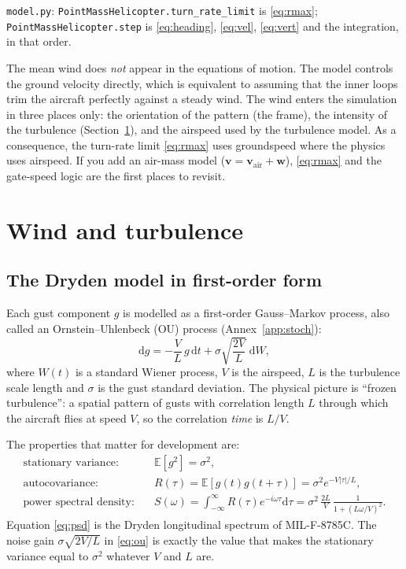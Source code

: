 \documentclass[11pt,a4paper]{article}
\newcommand{\code}[1]{\texttt{#1}}
\newcommand{\dd}{\mathrm{d}}
\newcommand{\E}{\mathbb{E}}
\begin{document}
\begin{codemap}
\code{model.py}: \code{PointMassHelicopter.turn\_rate\_limit} is \eqref{eq:rmax};
\code{PointMassHelicopter.step} is \eqref{eq:heading}, \eqref{eq:vel},
\eqref{eq:vert} and the integration, in that order.
\end{codemap}

\begin{devnote}
The mean wind does \emph{not} appear in the equations of motion. The model
controls the ground velocity directly, which is equivalent to assuming that the
inner loops trim the aircraft perfectly against a steady wind. The wind enters
the simulation in three places only: the orientation of the pattern (the frame),
the intensity of the turbulence (Section~\ref{sec:wind}), and the airspeed used
by the turbulence model. As a consequence, the turn-rate limit \eqref{eq:rmax}
uses groundspeed where the physics uses airspeed. If you add an air-mass model
($\mathbf{v}=\mathbf{v}_{\text{air}}+\mathbf{w}$), \eqref{eq:rmax} and the
gate-speed logic are the first places to revisit.
\end{devnote}

\section{Wind and turbulence}\label{sec:wind}

\subsection{The Dryden model in first-order form}

Each gust component $g$ is modelled as a first-order Gauss--Markov process,
also called an Ornstein--Uhlenbeck (OU) process (Annex~\ref{app:stoch}):
\begin{equation}
\dd g = -\frac{V}{L}\,g\,\dd t + \sigma\sqrt{\frac{2V}{L}}\;\dd W ,
\label{eq:ou}
\end{equation}
where $W(t)$ is a standard Wiener process, $V$ is the airspeed, $L$ is the
turbulence scale length and $\sigma$ is the gust standard deviation. The
physical picture is ``frozen turbulence'': a spatial pattern of gusts with
correlation length $L$ through which the aircraft flies at speed $V$, so the
correlation \emph{time} is $L/V$.

The properties that matter for development are:
\begin{align}
\text{stationary variance:}\quad & \E[g^2] = \sigma^2, \\
\text{autocovariance:}\quad & R(\tau)=\E[g(t)g(t+\tau)] = \sigma^2 e^{-V|\tau|/L}, \\
\text{power spectral density:}\quad &
S(\omega) = \int_{-\infty}^{\infty}\!R(\tau)e^{-i\omega\tau}\dd\tau
 = \sigma^2\,\frac{2L}{V}\,\frac{1}{1+(L\omega/V)^2}. \label{eq:psd}
\end{align}
Equation \eqref{eq:psd} is the Dryden longitudinal spectrum of MIL-F-8785C.
The noise gain $\sigma\sqrt{2V/L}$ in \eqref{eq:ou} is exactly the value that
makes the stationary variance equal to $\sigma^2$ whatever $V$ and $L$ are.
\end{document}
